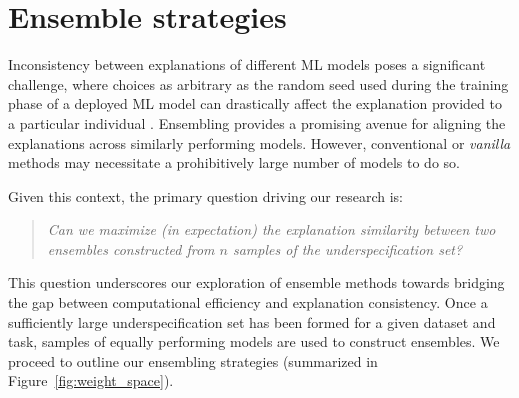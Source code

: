 \section{Ensemble strategies}
\label{sec:ensembles}

Inconsistency between explanations of different ML models poses a significant challenge, where choices as arbitrary as the random seed used during the training phase of a deployed ML model can drastically affect the explanation provided to a particular individual \citep{brunet2022, damour2022}. Ensembling provides a promising avenue for aligning the explanations across similarly performing models. However, conventional or \textit{vanilla} methods may necessitate a prohibitively large number of models to do so.

Given this context, the primary question driving our research is:

\begin{quote}
\centering
\textit{Can we maximize (in expectation) the explanation similarity between two ensembles constructed from $n$ samples of the underspecification set?} 
\end{quote}

This question underscores our exploration of ensemble methods towards bridging the gap between computational efficiency and explanation consistency. Once a sufficiently large underspecification set has been formed for a given dataset and task, samples of equally performing models are used to construct ensembles. We proceed to outline our ensembling strategies (summarized in Figure~\ref{fig:weight_space}).



